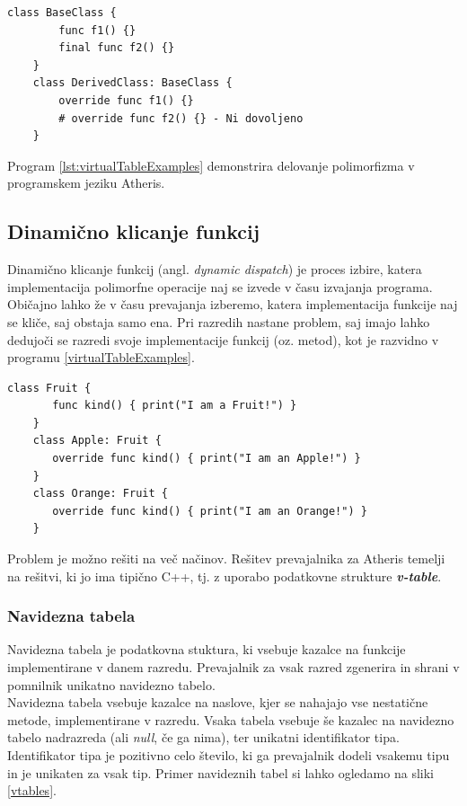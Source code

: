 \documentclass[a4paper, 12p]{book}
\begin{document}
\begin{lstlisting}[caption={Polimorfizem.}, captionpos=b, label={lst:virtualTableExamples}]
	class BaseClass {
	    func f1() {}
	    final func f2() {}
	}
	class DerivedClass: BaseClass {
	    override func f1() {}
	    # override func f2() {} - Ni dovoljeno
	}
\end{lstlisting}
%
Program \ref{lst:virtualTableExamples} demonstrira delovanje polimorfizma v programskem jeziku Atheris.

\subsection{Dinamično klicanje funkcij} \label{dynamicDispatch}

Dinamično klicanje funkcij (angl. \textit{dynamic dispatch}) je proces izbire, katera implementacija polimorfne operacije naj se izvede v času izvajanja programa. Običajno lahko že v času prevajanja izberemo, katera implementacija funkcije naj se kliče, saj obstaja samo ena. Pri razredih nastane problem, saj imajo lahko dedujoči se razredi svoje implementacije funkcij (oz. metod), kot je razvidno v programu \ref{virtualTableExamples}. 

\begin{lstlisting}[caption={Več implementacij za isto funkcionalnost.}, captionpos=b, label={virtualTableExamples}]
	class Fruit {
	   func kind() { print("I am a Fruit!") }
	}
	class Apple: Fruit {
	   override func kind() { print("I am an Apple!") }
	}
	class Orange: Fruit {
	   override func kind() { print("I am an Orange!") }
	}
\end{lstlisting}

\indent Problem je možno rešiti na več načinov. Rešitev prevajalnika za Atheris temelji na rešitvi, ki jo ima tipično C++, tj. z uporabo podatkovne strukture \textit{\textbf{v-table}}. 

\subsubsection{Navidezna tabela}

Navidezna tabela je podatkovna stuktura, ki vsebuje kazalce na funkcije implementirane v danem razredu. Prevajalnik za vsak razred zgenerira in shrani v pomnilnik unikatno navidezno tabelo. \\
\indent Navidezna tabela vsebuje kazalce na naslove, kjer se nahajajo vse nestatične metode, implementirane v razredu. Vsaka tabela vsebuje še kazalec na navidezno tabelo nadrazreda (ali \textit{null}, če ga nima), ter unikatni identifikator tipa. Identifikator tipa je pozitivno celo število, ki ga prevajalnik dodeli vsakemu tipu in je unikaten za vsak tip. Primer navideznih tabel si lahko ogledamo na sliki \ref{vtables}.
\end{document}
